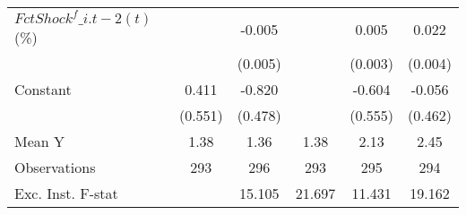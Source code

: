 {\begin{tabular}{l*{5}{c}}
\addlinespace
$ FctShock^f\_{i.t-2}(t)$ (\%)&                     &      -0.005         &                     &       0.005         &       0.022\sym{***}\\
                    &                     &     (0.005)         &                     &     (0.003)         &     (0.004)         \\
\addlinespace
Constant            &       0.411         &      -0.820         &                     &      -0.604         &      -0.056         \\
                    &     (0.551)         &     (0.478)         &                     &     (0.555)         &     (0.462)         \\
\midrule
Mean Y              &        1.38         &        1.36         &        1.38         &        2.13         &        2.45         \\
Observations        &         293         &         296         &         293         &         295         &         294         \\
Exc. Inst. F-stat   &                     &      15.105         &      21.697         &      11.431         &      19.162         \\
\bottomrule
\end{tabular}
}
